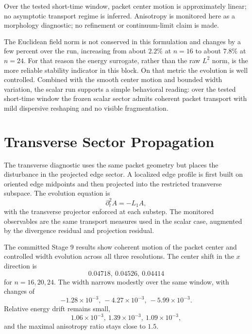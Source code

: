 \documentclass[11pt]{article}
\begin{document}
Over the tested short-time window, packet center motion is approximately linear; no asymptotic transport regime is inferred. Anisotropy is monitored here as a morphology diagnostic; no refinement or continuum-limit claim is made.

The Euclidean field norm is not conserved in this formulation and changes by a few percent over the run, increasing from about $2.2\%$ at $n=16$ to about $7.8\%$ at $n=24$. For that reason the energy surrogate, rather than the raw $L^2$ norm, is the more reliable stability indicator in this block. On that metric the evolution is well controlled. Combined with the smooth center motion and bounded width variation, the scalar run supports a simple behavioral reading: over the tested short-time window the frozen scalar sector admits coherent packet transport with mild dispersive reshaping and no visible fragmentation.

\section{Transverse Sector Propagation}
The transverse diagnostic uses the same packet geometry but places the disturbance in the projected edge sector. A localized edge profile is first built on oriented edge midpoints and then projected into the restricted transverse subspace. The evolution equation is
\begin{equation}
\partial_t^2 A = -L_1 A,
\end{equation}
with the transverse projector enforced at each substep. The monitored observables are the same transport measures used in the scalar case, augmented by the divergence residual and projection residual.

The committed Stage 9 results show coherent motion of the packet center and controlled width evolution across all three resolutions. The center shift in the $x$ direction is
\begin{equation}
0.04718,\ 0.04526,\ 0.04414
\end{equation}
for $n=16,20,24$. The width narrows modestly over the same window, with changes of
\begin{equation}
-1.28\times 10^{-3},\ -4.27\times 10^{-3},\ -5.99\times 10^{-3}.
\end{equation}
Relative energy drift remains small,
\begin{equation}
1.06\times 10^{-3},\ 1.39\times 10^{-3},\ 1.09\times 10^{-3},
\end{equation}
and the maximal anisotropy ratio stays close to $1.5$.
\end{document}

